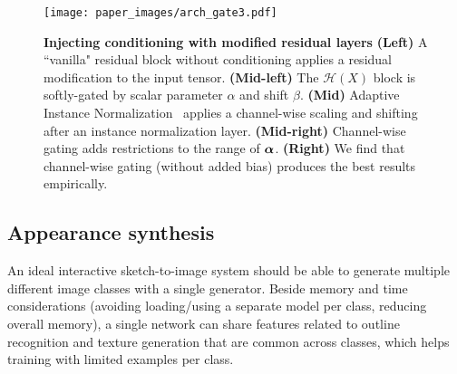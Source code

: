 \begin{figure*}[t]
	\centering
	\texttt{[image: paper\_images/arch\_gate3.pdf]}
	\vspace{-4mm}
	\caption{
		{\bf Injecting conditioning with modified residual layers} {\bf (Left)} A ``vanilla" residual block without conditioning applies a residual modification to the input tensor. {\bf (Mid-left)} The $\mathcal{H}(X)$ block is softly-gated by scalar parameter $\alpha$ and shift $\beta$. {\bf (Mid)} Adaptive Instance Normalization~\cite{huang2017arbitrary} applies a channel-wise scaling and shifting after an instance normalization layer. {\bf (Mid-right)} Channel-wise gating adds restrictions to the range of $\mbox{\boldmath $\alpha$}$. {\bf (Right)} We find that channel-wise gating (without added bias) produces the best results empirically.\label{fig:arch-gate2}
		\vspace{-2mm}
	}
\end{figure*}


\vspace{4mm}
\subsection{Appearance synthesis}
\label{sec:appearance}
An ideal interactive sketch-to-image system  should be able to generate multiple different image classes with a single generator. 
Beside memory and time considerations (avoiding loading/using a separate model per class, reducing overall memory), a single network can share features related to outline recognition and texture generation that are common across classes, which helps training with limited examples per class. %

